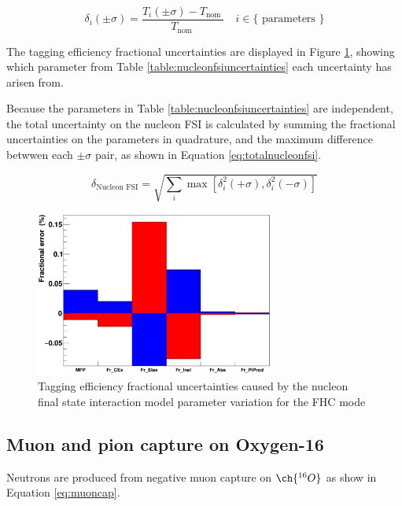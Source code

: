 \begin{equation}
\delta_{i}(\pm \sigma)=\frac{T_{i}(\pm \sigma)-T_{\text {nom }}}{T_{\text {nom }}} \quad i \in\{\text { parameters }\}
\label{eq:nucleonfsitageff}
\end{equation}

The tagging efficiency fractional uncertainties are displayed in Figure \ref{fig:nucleonfsiuncertainty}, showing which parameter from Table \ref{table:nucleonfsiuncertainties} each uncertainty has arisen from.

Because the parameters in Table \ref{table:nucleonfsiuncertainties} are independent, the total uncertainty on the nucleon FSI is calculated by summing the fractional uncertainties on the parameters in quadrature, and the maximum difference betwwen each $\pm \sigma$ pair, as shown in Equation \ref{eq:totalnucleonfsi}.

\begin{equation}
    \delta_{\text{Nucleon FSI}}=\sqrt{\sum_i \max \left[\delta_i^2(+\sigma), \delta_i^2(-\sigma)\right]}
\label{eq:totalnucleonfsi}
\end{equation}

\begin{figure}[!htb]
\centering 
    \includegraphics[width=0.7\textwidth]{Figures/nucleonfsi_uncertainty.png}
\caption{Tagging efficiency fractional uncertainties caused by the nucleon final state interaction model parameter variation for the FHC mode}
\label{fig:nucleonfsiuncertainty}
\end{figure}

\subsection{Muon and pion capture on Oxygen-16}

Neutrons are produced from negative muon capture on $\ch{^{16}O}$ as show in Equation \ref{eq:muoncap}.

